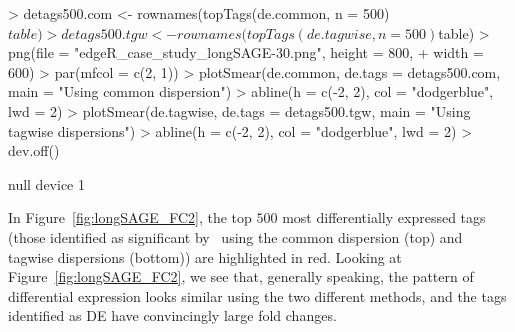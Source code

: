 \begin{Schunk}
\begin{Sinput}
> detags500.com <- rownames(topTags(de.common, n = 500)$table)
> detags500.tgw <- rownames(topTags(de.tagwise, n = 500)$table)
> png(file = "edgeR_case_study_longSAGE-30.png", height = 800, 
+     width = 600)
> par(mfcol = c(2, 1))
> plotSmear(de.common, de.tags = detags500.com, main = "Using common dispersion")
> abline(h = c(-2, 2), col = "dodgerblue", lwd = 2)
> plotSmear(de.tagwise, de.tags = detags500.tgw, main = "Using tagwise dispersions")
> abline(h = c(-2, 2), col = "dodgerblue", lwd = 2)
> dev.off()
\end{Sinput}
\begin{Soutput}
null device 
          1 
\end{Soutput}
\end{Schunk}

In Figure~\ref{fig:longSAGE_FC2}, the top $500$ most differentially
expressed tags (those identified as significant by \edgeR~using the
common dispersion (top) and tagwise dispersions (bottom)) are
highlighted in red. Looking at Figure~\ref{fig:longSAGE_FC2}, we see
that, generally speaking, the pattern of differential expression looks
similar using the two different methods, and the tags identified as DE
have convincingly large fold changes.

